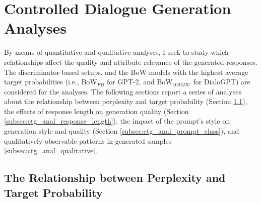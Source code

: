 










\section{Controlled Dialogue Generation Analyses}
\label{sec:exp2_analyses}

By means of quantitative and qualitative analyses, I seek to study which relationships affect the quality and attribute relevance of the generated responses. The discriminator-based setups, and the BoW-models with the highest average target probabilities (i.e., BoW$_{FB}$ for GPT-2, and BoW$_{100MIU}$ for DialoGPT) are considered for the analyses. The following sections report a series of analyses about the relationship between perplexity and target probability (Section \ref{subsec:ctg_anal_ppl_target_prob}), the effects of response length on generation quality (Section \ref{subsec:ctg_anal_response_length}), the impact of the prompt's style on generation style and quality (Section \ref{subsec:ctg_anal_prompt_class}), and qualitatively observable patterns in generated samples \ref{subsec:ctg_anal_qualitative}.




\subsection{The Relationship between Perplexity and Target Probability}
\label{subsec:ctg_anal_ppl_target_prob}


